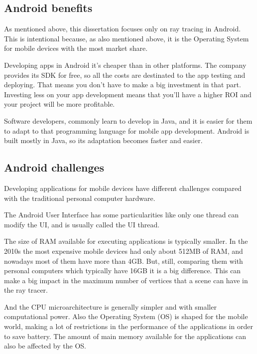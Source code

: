 \subsection{Android benefits}

\par
As mentioned above, this dissertation focuses only on ray tracing in Android.
This is intentional because, as also mentioned above, it is the Operating System for mobile devices with the most market share.

\par
Developing apps in Android it’s cheaper than in other platforms.
The company provides its SDK for free, so all the costs are destinated to the app testing and deploying.
That means you don’t have to make a big investment in that part.
Investing less on your app development means that you’ll have a higher ROI and your project will be more profitable.

\par
Software developers, commonly learn to develop in Java, and it is easier for them to adapt to that programming language for mobile app development.
Android is built mostly in Java, so its adaptation becomes faster and easier.

\subsection{Android challenges}

\par
Developing applications for mobile devices have different challenges compared with the traditional personal computer hardware.

\par
The Android User Interface has some particularities like only one thread can modify the UI, and is usually called the UI thread.

\par
The size of RAM available for executing applications is typically smaller.
In the 2010s the most expensive mobile devices had only about 512MB of RAM, and nowadays most of them have more than 4GB.
But, still, comparing them with personal computers which typically have 16GB it is a big difference.
This can make a big impact in the maximum number of vertices that a scene can have in the ray tracer.

\par
And the CPU microarchitecture is generally simpler and with smaller computational power.
Also the Operating System (OS) is shaped for the mobile world, making a lot of restrictions in the performance of the applications in order to save battery.
The amount of main memory available for the applications can also be affected by the OS.

